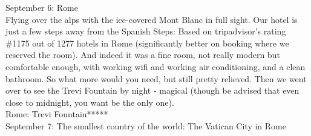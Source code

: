 September 6: Rome\\
Flying over the alps with the ice-covered Mont Blanc in full sight. Our hotel is just a few steps away from the Spanish Steps: Based on tripadvisor's rating \#1175 out of 1277 hotels in Rome (significantly better on booking where we reserved the room). And indeed it was a fine room, not really modern but comfortable enough, with working wifi and working air conditioning, and a clean bathroom. So what more would you need, but still pretty relieved. Then we went over to see the Trevi Fountain by night - magical (though be advised that even close to midnight, you want be the only one).\\

Rome: Trevi Fountain*****\\

September 7: The smallest country of the world: The Vatican City in Rome\\
